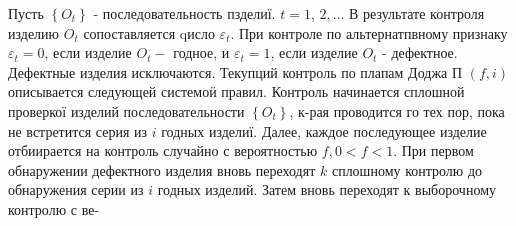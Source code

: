 \documentclass[10pt]{article}
\begin{document}
Пусть $\left\{O_{t}\right\}$ - последовательность пзделиї. $t=1$, $2, \ldots$ В результате контроля изделию $O_{t}$ сопоставляется qисло $\varepsilon_{t}$. При контроле по альтернатпвному признаку $\varepsilon_{t}=0$, если изделие $O_{t}-$ годное, и $\varepsilon_{t}=1$, если изделие $O_{t}$ - дефектное. Дефектные изделия исключаются. Текупций контроль по плапам Доджа П $(f, i)$ описывается следующей системоӥ правил. Контроль начинается сплошной проверкої изделий последовательности $\left\{O_{t}\right\}$, к-рая проводится го тех пор, пока не встретится серия из $i$ годных изделиї. Далее, каждое последующее изделие отбиирается на контроль случайно с вероятностью $f, 0<f<1$. При первом обнаружении дефектного изделия вновь переходят $k$ сплошному контролю до обнаружения серии из $i$ годных изделий. Затем вновь переходят к выборочному контролю с ве-
\end{document}
